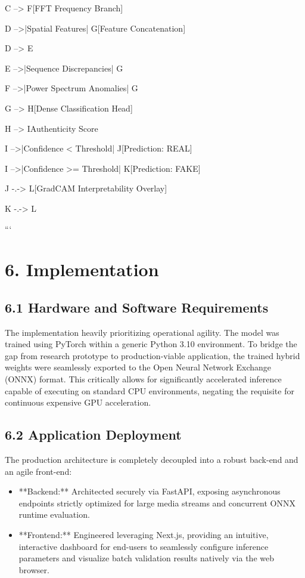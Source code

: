 \documentclass[12pt,a4paper]{article}
\begin{document}
C --> F[FFT Frequency Branch]

D -->|Spatial Features| G[Feature Concatenation]

D --> E

E -->|Sequence Discrepancies| G

F -->|Power Spectrum Anomalies| G

G --> H[Dense Classification Head]

H --> I{Authenticity Score}

I -->|Confidence < Threshold| J[Prediction: REAL]

I -->|Confidence >= Threshold| K[Prediction: FAKE]

J -.-> L[GradCAM Interpretability Overlay]

K -.-> L

```

\section{6. Implementation}
\subsection{6.1 Hardware and Software Requirements}
The implementation heavily prioritizing operational agility. The model was trained using PyTorch within a generic Python 3.10 environment. To bridge the gap from research prototype to production-viable application, the trained hybrid weights were seamlessly exported to the Open Neural Network Exchange (ONNX) format. This critically allows for significantly accelerated inference capable of executing on standard CPU environments, negating the requisite for continuous expensive GPU acceleration.

\subsection{6.2 Application Deployment}
The production architecture is completely decoupled into a robust back-end and an agile front-end:

\begin{itemize}
\item **Backend:** Architected securely via FastAPI, exposing asynchronous endpoints strictly optimized for large media streams and concurrent ONNX runtime evaluation.
\item **Frontend:** Engineered leveraging Next.js, providing an intuitive, interactive dashboard for end-users to seamlessly configure inference parameters and visualize batch validation results natively via the web browser.
\end{itemize}
\end{document}
